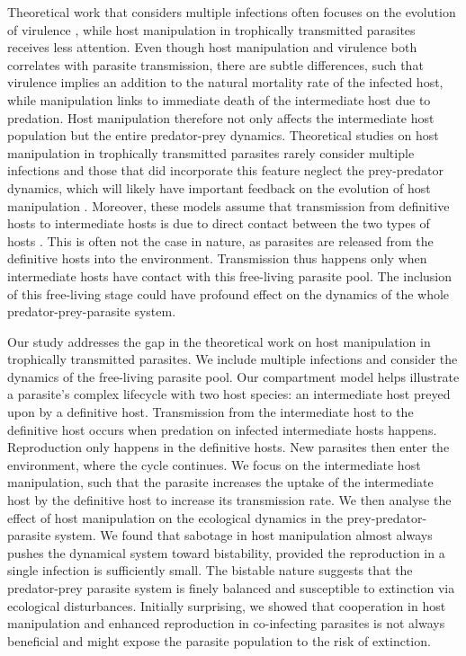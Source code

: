 \documentclass[a4paper]{scrartcl}
\begin{document}
Theoretical work that considers multiple infections often focuses on the evolution of virulence \citep{vanBaalen1995, Alizon2013, Alizon2008, Choisy2010, Alizon2012}, while host manipulation in trophically transmitted parasites receives less attention. 
Even though host manipulation and virulence both correlates with parasite transmission, there are subtle differences, such that virulence implies an addition to the natural mortality rate of the infected host, while manipulation links to immediate death of the intermediate host due to predation. 
Host manipulation therefore not only affects the intermediate host population but the entire predator-prey dynamics. 
Theoretical studies on host manipulation in trophically transmitted parasites rarely consider multiple infections and those that did incorporate this feature neglect the prey-predator dynamics, which will likely have important feedback on the evolution of host manipulation \citep{Parker2003,Vickery2009}.
Moreover, these models assume that transmission from definitive hosts to intermediate hosts is due to direct contact between the two types of hosts \citep{Rogawa2018, Iritani2018, Hadeler1989, Fenton2006}. 
This is often not the case in nature, as parasites are released from the definitive hosts into the environment. Transmission thus happens only when intermediate hosts have contact with this free-living parasite pool. The inclusion of this free-living stage could have profound effect on the dynamics of the whole predator-prey-parasite system.



Our study addresses the gap in the theoretical work on host manipulation in trophically transmitted parasites.
We include multiple infections and consider the dynamics of the free-living parasite pool. 
Our compartment model helps illustrate a parasite's complex lifecycle with two host species: an intermediate host preyed upon by a definitive host. 
Transmission from the intermediate host to the definitive host occurs when predation on infected intermediate hosts happens. 
Reproduction only happens in the definitive hosts. 
New parasites then enter the environment, where the cycle continues. 
We focus on the intermediate host manipulation, such that the parasite increases the uptake of the intermediate host by the definitive host to increase its transmission rate. 
We then analyse the effect of host manipulation on the ecological dynamics in the prey-predator-parasite system. 
We found that sabotage in host manipulation almost always pushes the dynamical system toward bistability, provided the reproduction in a single infection is sufficiently small. 
The bistable nature suggests that the predator-prey parasite system is finely balanced and susceptible to extinction via ecological disturbances. 
Initially surprising, we showed that cooperation in host manipulation and enhanced reproduction in co-infecting parasites is not always beneficial and might expose the parasite population to the risk of extinction.
\end{document}
